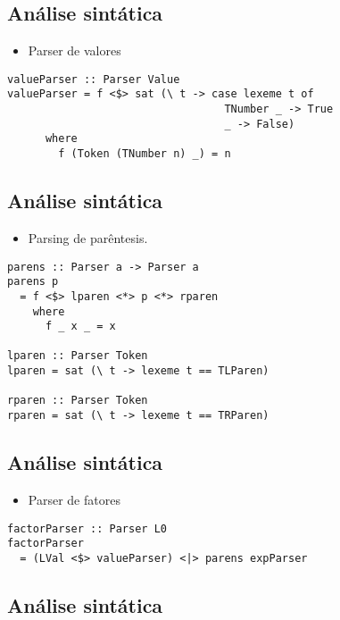 \documentclass[11pt]{article}
\begin{document}
\subsection*{Análise sintática}
\label{sec:orgc1d5a0a}

\begin{itemize}
\item Parser de valores
\end{itemize}

\begin{verbatim}
valueParser :: Parser Value
valueParser = f <$> sat (\ t -> case lexeme t of 
                                  TNumber _ -> True 
                                  _ -> False)
      where 
        f (Token (TNumber n) _) = n 
\end{verbatim}
\subsection*{Análise sintática}
\label{sec:org1d5b9a0}

\begin{itemize}
\item Parsing de parêntesis.
\end{itemize}

\begin{verbatim}
parens :: Parser a -> Parser a 
parens p 
  = f <$> lparen <*> p <*> rparen 
    where 
      f _ x _ = x 

lparen :: Parser Token 
lparen = sat (\ t -> lexeme t == TLParen)

rparen :: Parser Token 
rparen = sat (\ t -> lexeme t == TRParen)
\end{verbatim}
\subsection*{Análise sintática}
\label{sec:org84d08c5}

\begin{itemize}
\item Parser de fatores
\end{itemize}

\begin{verbatim}
factorParser :: Parser L0
factorParser 
  = (LVal <$> valueParser) <|> parens expParser 
\end{verbatim}
\subsection*{Análise sintática}
\label{sec:org167d188}
\end{document}
